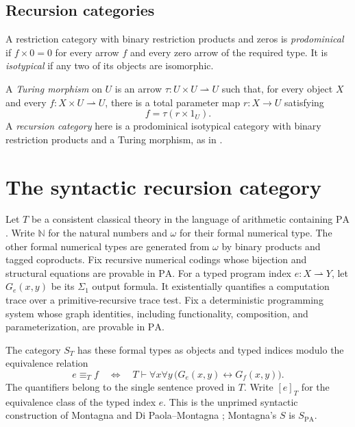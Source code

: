 \documentclass[11pt]{article}
\newcommand{\N}{\mathbb N}
\newcommand{\PA}{\mathrm{PA}}
\begin{document}
\subsection{Recursion categories}

A restriction category with binary restriction products and zeros is
\emph{prodominical} if $f\times0=0$ for every arrow $f$ and every
zero arrow of the required type. It is \emph{isotypical} if any
two of its objects are isomorphic.

A \emph{Turing morphism} on $U$ is an arrow
$\tau:U\times U\rightharpoonup U$ such that, for every object $X$
and every $f:X\times U\rightharpoonup U$, there is a total
parameter map $r:X\to U$ satisfying
\[
 f=\tau(r\times1_U).
\]
A \emph{recursion category} here is a prodominical isotypical
category with binary restriction products and a Turing morphism,
as in \cite[Section 9]{Heller}.

\section{The syntactic recursion category}\label{sec:syntactic}

Let $T$ be a consistent classical theory in the language of arithmetic
containing $\PA$. Write $\N$ for the natural numbers and $\omega$
for their formal numerical type. The other formal numerical types are
generated from $\omega$ by binary products and tagged coproducts.
Fix recursive numerical codings
whose bijection and structural equations are provable in $\PA$.
For a typed program index $e:X\rightharpoonup Y$, let $G_e(x,y)$ be its
$\Sigma_1$ output formula. It existentially quantifies a computation trace
over a primitive-recursive trace test. Fix a deterministic programming
system whose graph identities, including functionality, composition,
and parameterization, are provable in $\PA$.

The category $S_T$ has these formal types as objects and typed indices
modulo the equivalence relation
\begin{equation}\label{eq:uniform}
 e\equiv_T f
 \quad\Longleftrightarrow\quad
 T\vdash \forall x\forall y\,
       \bigl(G_e(x,y)\leftrightarrow G_f(x,y)\bigr).
\end{equation}
The quantifiers belong to the single sentence proved in $T$.
Write $[e]_T$ for the equivalence class of the typed index $e$.
This is the unprimed syntactic construction of Montagna and
Di Paola--Montagna \cite{Montagna,DPM}; Montagna's $S$ is $S_{\PA}$.
\end{document}
